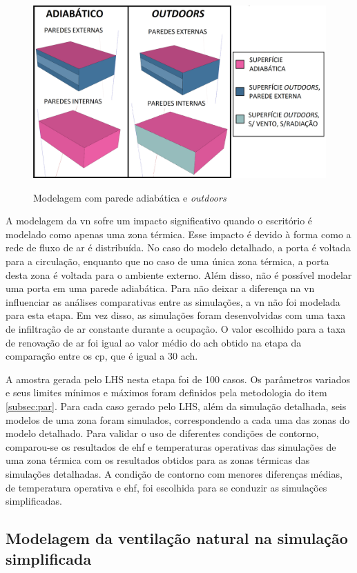 \documentclass[brazil,hardcopy,openany]{ufscthesis} %
\begin{document}
\begin{figure}[h]
	\centering
	\caption{Modelagem com parede adiabática e \textit{outdoors}}
	\includegraphics[width=.7\linewidth]{img/adiabatic_outdoors2.png}
	\label{fig:adiabatic_outdoors}
\end{figure}


A modelagem da \acrlong{vn} sofre um impacto significativo quando o escritório é modelado como apenas uma zona térmica.
Esse impacto é devido à forma como a rede de fluxo de ar é distribuída. No caso do modelo detalhado, a porta é voltada para a circulação, enquanto que no caso de uma única zona térmica, a porta desta zona é voltada para o ambiente externo. 
Além disso, não é possível modelar uma porta em uma parede adiabática. Para não deixar a diferença na \acrlong{vn} influenciar as análises comparativas entre as simulações, a \acrlong{vn} não foi modelada para esta etapa.
Em vez disso, as simulações foram desenvolvidas com uma taxa de infiltração de ar constante durante a ocupação. O valor escolhido para a taxa de renovação de ar foi igual ao valor médio do \acrshort{ach} obtido na etapa da comparação entre os \acrshort{cp}, que é igual a 30 \acrshort{ach}.

A amostra gerada pelo LHS nesta etapa foi de 100 casos.
Os parâmetros variados e seus limites mínimos e máximos foram definidos pela metodologia do item \ref{subsec:par}.
Para cada caso gerado pelo LHS, além da simulação detalhada, seis modelos de uma zona foram simulados, correspondendo a cada uma das zonas do modelo detalhado.
Para validar o uso de diferentes condições de contorno, comparou-se os resultados de \acrshort{ehf} e temperaturas operativas das simulações de uma zona térmica com os resultados obtidos para as zonas térmicas das simulações detalhadas.
A condição de contorno com menores diferenças médias, de temperatura operativa e \acrshort{ehf}, foi escolhida para se conduzir as simulações simplificadas.

\subsection*{Modelagem da ventilação natural na simulação simplificada}
\end{document}
